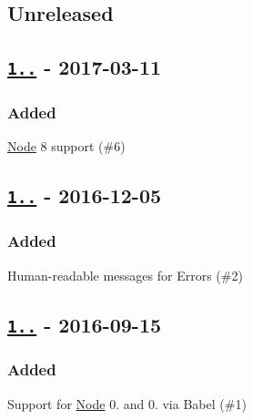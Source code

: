\subsection*{Unreleased}

\subsection*{\href{https://github.com/malept/sumchecker/compare/v1.3.0...v1.3.1}{\tt 1..} -\/ 2017-\/03-\/11}

\subsubsection*{Added}


\begin{DoxyItemize}
\item \mbox{\hyperlink{classNode}{Node}} 8 support (\#6)
\end{DoxyItemize}

\subsection*{\href{https://github.com/malept/sumchecker/compare/v1.2.0...v1.3.0}{\tt 1..} -\/ 2016-\/12-\/05}

\subsubsection*{Added}


\begin{DoxyItemize}
\item Human-\/readable messages for Errors (\#2)
\end{DoxyItemize}

\subsection*{\href{https://github.com/malept/sumchecker/compare/v1.1.0...v1.2.0}{\tt 1..} -\/ 2016-\/09-\/15}

\subsubsection*{Added}


\begin{DoxyItemize}
\item Support for \mbox{\hyperlink{classNode}{Node}} 0. and 0. via Babel (\#1)
\end{DoxyItemize}

